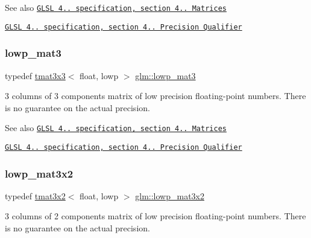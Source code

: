\begin{DoxySeeAlso}{See also}
\href{http://www.opengl.org/registry/doc/GLSLangSpec.4.20.8.pdf}{\tt G\+L\+SL 4.. specification, section 4.. Matrices} 

\href{http://www.opengl.org/registry/doc/GLSLangSpec.4.20.8.pdf}{\tt G\+L\+SL 4.. specification, section 4.. Precision Qualifier} 
\end{DoxySeeAlso}
\mbox{\label{group__core__precision_ga35fabe40e121bf764419b1d355cbbcd2}} 
\subsubsection{\texorpdfstring{lowp\+\_\+mat3}{lowp\_mat3}}
{\footnotesize\ttfamily typedef \hyperlink{structglm_1_1tmat3x3}{tmat3x3}$<$ float, lowp $>$ \hyperlink{group__core__precision_ga35fabe40e121bf764419b1d355cbbcd2}{glm\+::lowp\+\_\+mat3}}

3 columns of 3 components matrix of low precision floating-\/point numbers. There is no guarantee on the actual precision.

\begin{DoxySeeAlso}{See also}
\href{http://www.opengl.org/registry/doc/GLSLangSpec.4.20.8.pdf}{\tt G\+L\+SL 4.. specification, section 4.. Matrices} 

\href{http://www.opengl.org/registry/doc/GLSLangSpec.4.20.8.pdf}{\tt G\+L\+SL 4.. specification, section 4.. Precision Qualifier} 
\end{DoxySeeAlso}
\mbox{\label{group__core__precision_ga8db0631a52908b3b4805b6abeda26176}} 
\subsubsection{\texorpdfstring{lowp\+\_\+mat3x2}{lowp\_mat3x2}}
{\footnotesize\ttfamily typedef \hyperlink{structglm_1_1tmat3x2}{tmat3x2}$<$ float, lowp $>$ \hyperlink{group__core__precision_ga8db0631a52908b3b4805b6abeda26176}{glm\+::lowp\+\_\+mat3x2}}

3 columns of 2 components matrix of low precision floating-\/point numbers. There is no guarantee on the actual precision.

